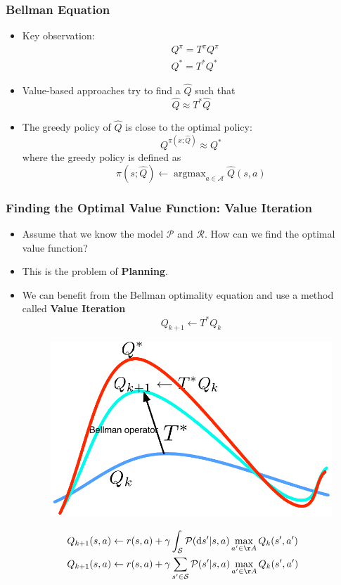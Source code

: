 \documentclass[handout]{beamer}
\newcommand{\Qopt}{Q^*}
\newcommand{\Qpi}{Q^\pi}
\newcommand{\Qhat}{\hat{Q}}
\newcommand{\Tpi}{T^\pi}
\newcommand{\Topt}{{T^*}}
\newcommand{\piopt}{{\pi^*}}
\newcommand{\argmax}{\mathop{\text{argmax}}}
\newcommand{\States}{\mathcal{S}}
\newcommand{\Actions}{\mathcal{A}}
\newcommand{\PKernel}{\mathcal{P}}
\newcommand{\RKernel}{\mathcal{R}}
\newcommand{\ds}{\mathrm{d}s}
\renewcommand{\high}{\textbf}
\begin{document}
\begin{frame}\frametitle{Bellman Equation}\small

\begin{itemize}

	\item Key observation:
	\begin{align*}
	  & \Qpi = \Tpi \Qpi \\
	  & \Qopt = \Topt \Qopt
	\end{align*}

	\item Value-based approaches try to find a $\Qhat$ such that
	\[
	  \Qhat \approx \Topt \Qhat
	\]

	\item The greedy policy of $\Qhat$ is close to the optimal policy:
	\[
		  Q^{\pi(x;\Qhat)} \approx \Qopt
	\]
	where the greedy policy is defined as
	\[
	  \pi(s; \Qhat) \leftarrow \argmax_{a \in \Actions} \Qhat(s,a)
	\]
\end{itemize}
\end{frame}


\begin{frame}\frametitle{Finding the Optimal Value Function: Value Iteration}\small
\begin{itemize}
	\item Assume that we know the model $\PKernel$ and $\RKernel$. How can we find the optimal value function?
	\item This is the problem of \high{Planning}.
	\item We can benefit from the Bellman optimality equation and use a method called \high{Value Iteration}
		\[
			Q_{k+1} \leftarrow \Topt Q_k
		\]
	\begin{figure}
		\includegraphics[width=0.4\linewidth]{Figures/VI} 
	\end{figure}
\end{itemize}
\vspace{-0.5cm}
\begin{align*}
	&
	Q_{k+1}(s,a) \leftarrow r(s,a) + \gamma \int_{\States} \PKernel(\ds' | s,a) \max_{a' \in \AA} Q_k(s',a')
	\\
	& Q_{k+1}(s,a) \leftarrow r(s,a) + \gamma \sum_{s' \in \States} \PKernel(s' | s,a) \max_{a' \in \AA} Q_k(s',a')
\end{align*}



\end{frame}
\end{document}
